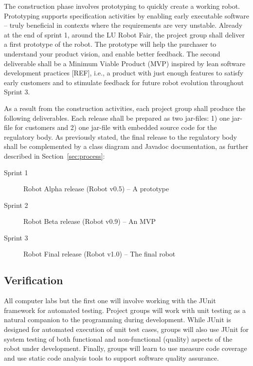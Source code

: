 \documentclass{scrreprt}
\begin{document}
\begin{description}
\end{description}

The construction phase involves prototyping to quickly create a working robot. Prototyping supports specification activities by enabling early executable software -- truly beneficial in contexts where the requirements are very unstable. Already at the end of sprint 1, around the LU Robot Fair, the project group shall deliver a first prototype of the robot. The prototype will help the purchaser to understand your product vision, and enable better feedback. The second deliverable shall be a Minimum Viable Product (MVP) inspired by lean software development practices [REF], i.e., a product with just enough features to satisfy early customers and to stimulate feedback for future robot evolution throughout Sprint 3. 

As a result from the construction activities, each project group shall produce the following deliverables. Each release shall be prepared as two jar-files: 1) one jar-file for customers and 2) one jar-file with embedded source code for the regulatory body. As previously stated, the final release to the regulatory body shall be complemented by a class diagram and Javadoc documentation, as further described in Section~\ref{sec:process}:
\begin{description}
\item[Sprint 1] Robot Alpha release (Robot v0.5) -- A prototype
\item[Sprint 2] Robot Beta release (Robot v0.9) -- An MVP
\item[Sprint 3] Robot Final release (Robot v1.0) -- The final robot
\end{description}

\subsection{Verification}
All computer labs but the first one will involve working with the JUnit framework for automated testing. Project groups will work with unit testing as a natural companion to the programming during development. While JUnit is designed for automated execution of unit test cases, groups will also use JUnit for system testing of both functional and non-functional (quality) aspects of the robot under development. Finally, groups will learn to use measure code coverage and use static code analysis tools to support software quality assurance.
\end{document}
